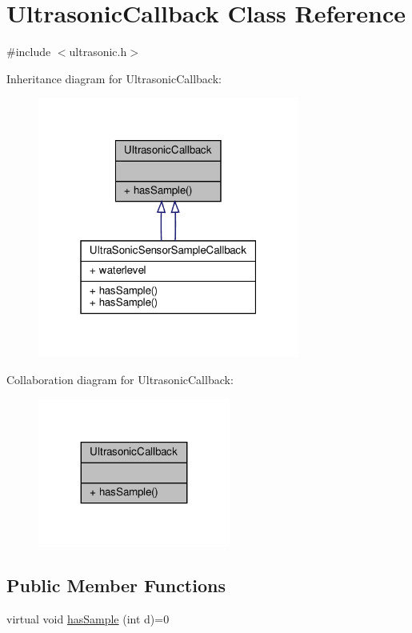 \hypertarget{classUltrasonicCallback}{}\section{Ultrasonic\+Callback Class Reference}
\label{classUltrasonicCallback}


{\ttfamily \#include $<$ultrasonic.\+h$>$}



Inheritance diagram for Ultrasonic\+Callback\+:
\nopagebreak
\begin{figure}[H]
\begin{center}
\leavevmode
\includegraphics[width=244pt]{classUltrasonicCallback__inherit__graph}
\end{center}
\end{figure}


Collaboration diagram for Ultrasonic\+Callback\+:
\nopagebreak
\begin{figure}[H]
\begin{center}
\leavevmode
\includegraphics[width=179pt]{classUltrasonicCallback__coll__graph}
\end{center}
\end{figure}
\subsection*{Public Member Functions}
\begin{DoxyCompactItemize}
\item 
virtual void \hyperlink{classUltrasonicCallback_aded93e2bea7669f1f225f8b35a085052}{has\+Sample} (int d)=0
\end{DoxyCompactItemize}


